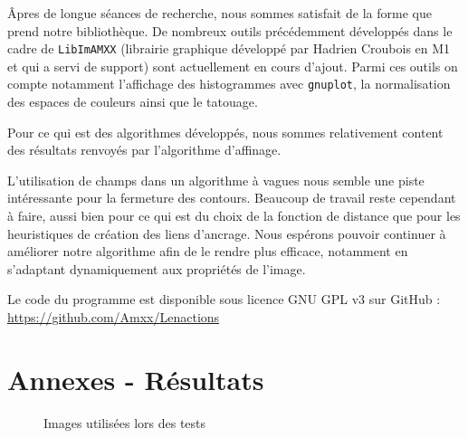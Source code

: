 Âpres de longue séances de recherche, nous sommes satisfait de la forme que prend notre bibliothèque. De nombreux outils précédemment développés dans le cadre de \texttt{LibImAMXX} (librairie graphique développé par Hadrien Croubois en M1 et qui a servi de support) sont actuellement en cours d'ajout. Parmi ces outils on compte notamment l'affichage des histogrammes avec \texttt{gnuplot}, la normalisation des espaces de couleurs ainsi que le tatouage.

Pour ce qui est des algorithmes développés, nous sommes relativement content des résultats renvoyés par l'algorithme d'affinage.

L'utilisation de champs dans un algorithme à vagues nous semble une piste intéressante pour la fermeture des contours. Beaucoup de travail reste cependant à faire, aussi bien pour ce qui est du choix de la fonction de distance que pour les heuristiques de création des liens d'ancrage.
Nous espérons pouvoir continuer à améliorer notre algorithme afin de le rendre plus efficace, notamment en s'adaptant dynamiquement aux propriétés de l'image.

Le code du programme est disponible sous licence GNU GPL v3 sur GitHub : \url{https://github.com/Amxx/Lenactions}

\appendix
\newpage
\section{Annexes - Résultats} \label{resultats}


\begin{figure}[ht]
	\center
	\caption{Images utilisées lors des tests}
\end{figure}

